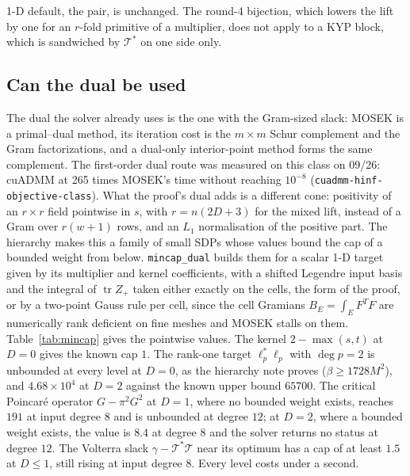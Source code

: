 \documentclass[12pt]{article}
\newcommand{\mcl}[1]{\mathcal{#1}}
\newcommand{\code}[1]{\texttt{#1}}
\theoremstyle{plain}
\theoremstyle{definition}
\theoremstyle{remark}
\begin{document}
1-D default, the pair, is unchanged. The round-4 bijection, which lowers the lift by one for an $r$-fold primitive of a multiplier, does not apply to a KYP block, which is sandwiched by $\mcl T^*$ on one side only.

\subsection{Can the dual be used}

The dual the solver already uses is the one with the Gram-sized slack: MOSEK is a primal--dual method, its iteration cost is the $m\times m$ Schur complement and the Gram factorizations, and a dual-only interior-point method forms the same complement. The first-order dual route was measured on this class on 09/26: cuADMM at 265 times MOSEK's time without reaching $10^{-8}$ (\code{cuadmm-hinf-objective-class}). What the proof's dual adds is a different cone: positivity of an $r\times r$ field pointwise in $s$, with $r=n(2D+3)$ for the mixed lift, instead of a Gram over $r(w+1)$ rows, and an $L_1$ normalisation of the positive part. The hierarchy makes this a family of small SDPs whose values bound the cap of a bounded weight from below. \code{mincap\_dual} builds them for a scalar 1-D target given by its multiplier and kernel coefficients, with a shifted Legendre input basis and the integral of $\operatorname{tr}Z_+$ taken either exactly on the cells, the form of the proof, or by a two-point Gauss rule per cell, since the cell Gramians $B_E=\int_EF^TF$ are numerically rank deficient on fine meshes and MOSEK stalls on them. Table~\ref{tab:mincap} gives the pointwise values. The kernel $2-\max(s,t)$ at $D=0$ gives the known cap $1$. The rank-one target $\ell_p^*\ell_p$ with $\deg p=2$ is unbounded at every level at $D=0$, as the hierarchy note proves ($\beta\ge1728M^2$), and $4.68\times10^{4}$ at $D=2$ against the known upper bound $65700$. The critical Poincar\'e operator $G-\pi^2G^2$ at $D=1$, where no bounded weight exists, reaches $191$ at input degree $8$ and is unbounded at degree $12$; at $D=2$, where a bounded weight exists, the value is $8.4$ at degree $8$ and the solver returns no status at degree $12$. The Volterra slack $\gamma-\mcl T^*\mcl T$ near its optimum has a cap of at least $1.5$ at $D\le1$, still rising at input degree $8$. Every level costs under a second.
\end{document}
